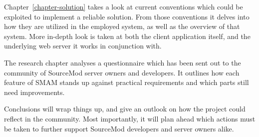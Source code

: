 Chapter~\ref{chapter-solution} takes a look at current conventions which could be exploited to implement a reliable solution.
From those conventions it delves into how they are utilized in the employed system, as well as the overview of that system.
More in-depth look is taken at both the client application itself, and the underlying web server it works in conjunction with.

The research chapter analyses a questionnaire which has been sent out to the community of SourceMod server owners and developers.
It outlines how each feature of SMAM stands up against practical requirements and which parts still need improvements.

Conclusions will wrap things up, and give an outlook on how the project could reflect in the community.
Most importantly, it will plan ahead which actions must be taken to further support SourceMod developers and server owners alike.
